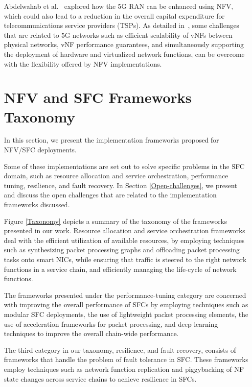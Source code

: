\documentclass[futureinternet,review,accept,pdftex,moreauthors]{Definitions/mdpi}
\begin{document}
Abdelwahab {et al.}~\cite{abdelwahab2016network} explored how the 5G RAN can be enhanced using NFV, which could also lead to a reduction in the overall capital expenditure for telecommunications service providers (TSPs). As detailed in~\cite{abdelwahab2016network}, some challenges that are related to 5G networks such as efficient scalability of vNFs between physical networks, vNF performance guarantees, and simultaneously supporting the deployment of hardware and virtualized network functions, can be overcome with the flexibility offered by NFV implementations.



\section{NFV and SFC Frameworks Taxonomy}
\label{SFC implementation frameworks}
In this section, we present the implementation frameworks proposed for NFV/SFC deployments. 

Some of these implementations are set out to solve specific problems in the SFC domain, such as resource allocation and service orchestration, performance tuning, resilience, and fault recovery. In Section \ref{Open-challenges}, we present and discuss the open challenges that are related to the implementation frameworks discussed.


Figure \ref{Taxonomy} depicts a summary of the taxonomy of the frameworks presented in our work. Resource allocation and service orchestration frameworks deal with the efficient utilization of available resources, by employing techniques such as synthesizing packet processing graphs and offloading packet processing tasks onto smart NICs, while ensuring that traffic is steered to the right network functions in a service chain, and efficiently managing the life-cycle of network functions. 
 
The frameworks presented under the performance-tuning category are concerned with improving the overall performance of SFCs by employing techniques such as modular SFC deployments, the use of lightweight packet processing elements, the use of acceleration frameworks for packet processing, and deep learning techniques to improve the overall chain-wide performance.

The third category in our taxonomy, resilience, and fault recovery, consists of frameworks that handle the problem of fault tolerance in SFC. These frameworks employ techniques such as network function replication and piggybacking of NF state changes across service chains to achieve resilience in SFCs.
\end{document}
